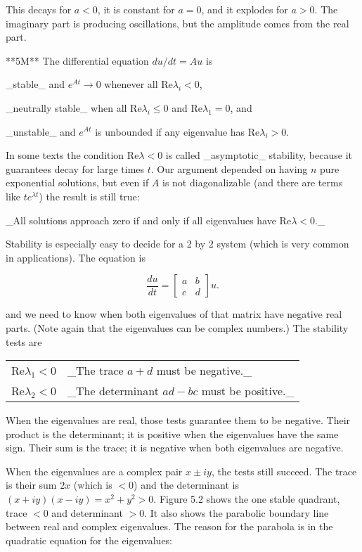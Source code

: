This decays for \(a<0\), it is constant for \(a=0\), and it explodes for \(a>0\). The imaginary part is producing oscillations, but the amplitude comes from the real part.

**5M** The differential equation \(du/dt=Au\) is

_stable_ and \(e^{At}\to 0\) whenever all \(\mathrm{Re}\lambda_{i}<0\),

_neutrally stable_ when all \(\mathrm{Re}\lambda_{i}\leq 0\) and \(\mathrm{Re}\lambda_{1}=0\), and

_unstable_ and \(e^{At}\) is unbounded if any eigenvalue has \(\mathrm{Re}\lambda_{i}>0\).

In some texts the condition \(\mathrm{Re}\lambda<0\) is called _asymptotic_ stability, because it guarantees decay for large times \(t\). Our argument depended on having \(n\) pure exponential solutions, but even if \(A\) is not diagonalizable (and there are terms like \(te^{\lambda t}\)) the result is still true:

_All solutions approach zero if and only if all eigenvalues have \(\mathrm{Re}\lambda<0\)._

Stability is especially easy to decide for a 2 by 2 system (which is very common in applications). The equation is

\[\frac{du}{dt}=\begin{bmatrix}a&b\\ c&d\end{bmatrix}u.\]

and we need to know when both eigenvalues of that matrix have negative real parts. (Note again that the eigenvalues can be complex numbers.) The stability tests are

\begin{tabular}{|l l|} \hline Re\(\lambda_{1}<0\) & _The trace \(a+d\) must be negative._ \\ Re\(\lambda_{2}<0\) & _The determinant \(ad-bc\) must be positive._ \\ \hline \end{tabular} When the eigenvalues are real, those tests guarantee them to be negative. Their product is the determinant; it is positive when the eigenvalues have the same sign. Their sum is the trace; it is negative when both eigenvalues are negative.

When the eigenvalues are a complex pair \(x\pm iy\), the tests still succeed. The trace is their sum \(2x\) (which is \(<0\)) and the determinant is \((x+iy)(x-iy)=x^{2}+y^{2}>0\). Figure 5.2 shows the one stable quadrant, trace \(<0\) and determinant \(>0\). It also shows the parabolic boundary line between real and complex eigenvalues. The reason for the parabola is in the quadratic equation for the eigenvalues:

